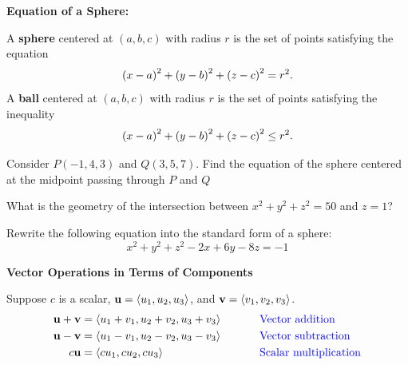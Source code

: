 \documentclass[../mathNotesPreamble]{subfiles}
\begin{document}
  \textbf{Equation of a Sphere:}
  \begin{defn*}
    A \textbf{sphere} centered at $(a,b,c)$ with radius $r$ is the set of points satisfying the equation
      \[{\left(x-a\right)}^2+{\left(y-b\right)}^2+{\left(z-c\right)}^2=r^2.\]
    A \textbf{ball} centered at $(a,b,c)$ with radius $r$ is the set of points satisfying the inequality
      \[{\left(x-a\right)}^2+{\left(y-b\right)}^2+{\left(z-c\right)}^2\leq r^2.\]
  \end{defn*}

  \begin{ex*}
    Consider $P(-1,4,3)$ and $Q(3,5,7)$. Find the equation of the sphere centered at the midpoint passing through $P$ and $Q$
  \end{ex*}

  \begin{ex*}
    What is the geometry of the intersection between $x^2+y^2+z^2=50$ and $z=1$?
  \end{ex*}
  \pagebreak

  \begin{ex*}
    Rewrite the following equation into the standard form of a sphere:
      \[x^2+y^2+z^2-2x+6y-8z=-1\]
  \end{ex*}
  \pagebreak
  
  \textbf{Vector Operations in Terms of Components}
    \begin{defn*}
      Suppose $c$ is a scalar, ${\mathbf{u}}={\left\langle u_1,u_2,u_3 \right\rangle}$, and ${\mathbf{v}}={\left\langle v_1,v_2,v_3 \right\rangle}$.
        \begin{alignat*}{2}
          {\mathbf{u}}+{\mathbf{v}}&={\left\langle u_1+v_1,u_2+v_2,u_3+v_3 \right\rangle}&\hspace*{25pt}& \textnormal{\textcolor{blue}{ Vector addition}}\\
          {\mathbf{u}}-{\mathbf{v}}&={\left\langle u_1-v_1,u_2-v_2,u_3-v_3 \right\rangle}&& \textnormal{\textcolor{blue}{ Vector subtraction}}\\
          c{\mathbf{u}}&={\left\langle cu_1,cu_2,cu_3 \right\rangle}&& \textnormal{\textcolor{blue}{ Scalar multiplication}}
        \end{alignat*}
    \end{defn*}
\end{document}
